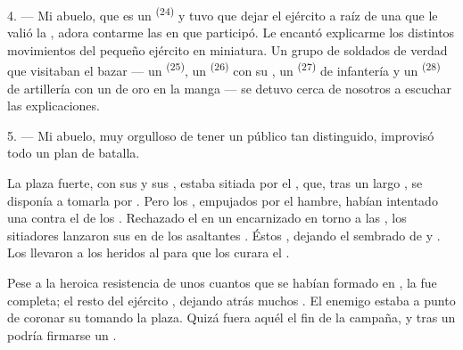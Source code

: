 \VUsaut{4.0mm}
\VUsaut{2.8mm}

4. --- Mi abuelo, que es un  \textsuperscript{(24)} y tuvo
que dejar el ejército a raíz de una  que le valió la
, adora contarme las  en que
participó. Le encantó explicarme los distintos movimientos del pequeño
ejército en miniatura. Un grupo de soldados de verdad que visitaban el
bazar --- un  \textsuperscript{(25)}, un
 \textsuperscript{(26)} con su , un
 \textsuperscript{(27)} de infantería y un 
\textsuperscript{(28)} de artillería con un  de oro en la manga --- se
detuvo cerca de nosotros a escuchar las explicaciones.

5. --- Mi abuelo, muy orgulloso de tener un público tan distinguido,
improvisó todo un plan de batalla.

La plaza fuerte, con sus  y sus , estaba
sitiada por el , que, tras un largo
, se disponía a tomarla por . Pero los
, empujados por el hambre, habían intentado una
 contra el  de los .
Rechazado el  en un encarnizado  en torno a
las , los sitiadores  lanzaron sus
 en  de los asaltantes
. Éstos , dejando el
 sembrado de  y .
Los  llevaron a los heridos al 
para que los curara el .

Pese a la heroica resistencia de unos cuantos  que se
habían formado en , la  fue completa; el
resto del ejército , dejando atrás muchos .
El enemigo estaba a punto de coronar su  tomando la plaza.
Quizá fuera aquél el fin de la campaña, y tras un  podría
firmarse un .

\VUsaut{4.4mm}
\VUsaut{2.8mm}

